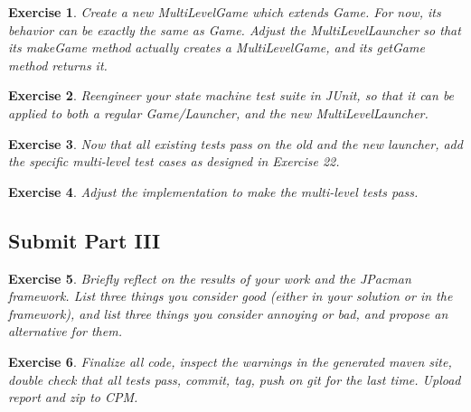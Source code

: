 \documentclass[a4paper]{article}
\newtheorem{thm}{Exercise}
\begin{document}
    \begin{thm}
      Create a new MultiLevelGame which extends Game.
      For now, its behavior can be exactly the same as Game.
      Adjust the MultiLevelLauncher so that its makeGame method actually creates a MultiLevelGame,
      and its getGame method returns it.
    \end{thm}
    
    \begin{thm}
      Reengineer your state machine test suite in JUnit, so that it can be applied to both a regular Game/Launcher, and the new MultiLevelLauncher.
    \end{thm}
    
    \begin{thm}
      Now that all existing tests pass on the old and the new launcher, add the specific multi-level test cases as designed in Exercise 22.
    \end{thm}
    
    \begin{thm}
      Adjust the implementation to make the multi-level tests pass.
    \end{thm}
    
  \subsection{Submit Part III}
    \begin{thm}
      Briefly reflect on the results of your work and the JPacman framework.
      List three things you consider good (either in your solution or in the framework),
      and list three things you consider annoying or bad, and propose an alternative for them.
    \end{thm}
  
    \begin{thm}
      Finalize all code, inspect the warnings in the generated maven site, double check
      that all tests pass, commit, tag, push on git for the last time. Upload report and zip to CPM.
    \end{thm}
\end{document}
